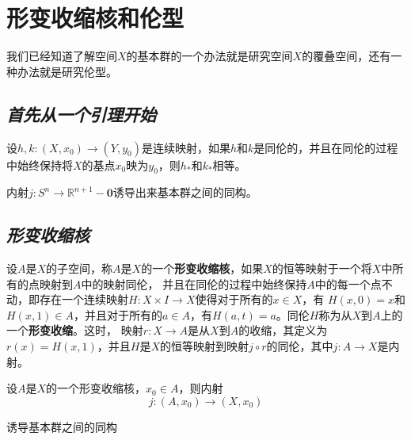 \section{形变收缩核和伦型}

我们已经知道了解空间$X$的基本群的一个办法就是研究空间$X$的覆叠空间，还有一种办法就是研究伦型。

\subsection*{\textsl{首先从一个引理开始}}

\begin{mdframed}
    \begin{lemma}
        设$h,k:(X,x_0)\rightarrow (Y,y_0)$是连续映射，如果$h$和$k$是同伦的，并且在同伦的过程中始终保持将$X$的基点$x_0$映为$y_0$，则$h_*$和$k_*$相等。
    \end{lemma}
\end{mdframed}

\begin{mdframed}
    \begin{theorem}
        内射$j:S^n\rightarrow \mathbb{R}^{n+1}-\mathbf{0}$诱导出来基本群之间的同构。
    \end{theorem}
\end{mdframed}

\subsection*{\textsl{形变收缩核}}


    \begin{define}
        设$A$是$X$的子空间，称$A$是$X$的一个\textbf{形变收缩核}，如果$X$的恒等映射于一个将$X$中所有的点映射到$A$中的映射同伦，
        并且在同伦的过程中始终保持$A$中的每一个点不动，即存在一个连续映射$H:X\times I\rightarrow X$使得对于所有的$x\in X$，有
        $H(x,0)=x$和$H(x,1)\in A$，并且对于所有的$a\in A$，有$H(a,t)=a$。同伦$H$称为从$X$到$A$上的一个\textbf{形变收缩}。这时，
        映射$r:X\rightarrow A$是从$X$到$A$的收缩，其定义为$r(x)=H(x,1)$，并且$H$是$X$的恒等映射到映射$j\circ r$的同伦，其中$j:A\rightarrow X$是内射。
    \end{define}

    \vspace*{1em}

    \begin{mdframed}
        \begin{theorem}
            设$A$是$X$的一个形变收缩核，$x_0\in A$，则内射
            \begin{equation}
                j:(A,x_0)\rightarrow (X,x_0)
            \end{equation}

            诱导基本群之间的同构
        \end{theorem}
    \end{mdframed}


